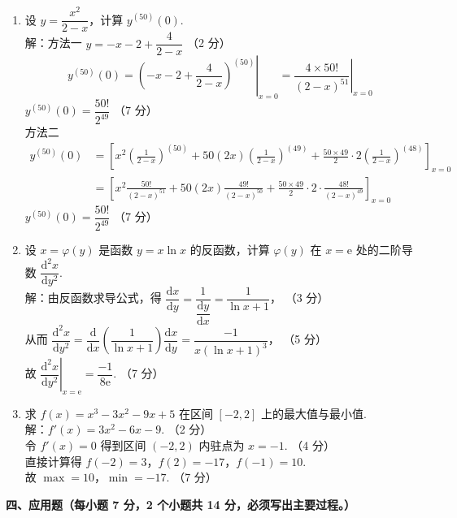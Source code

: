 \documentclass[a4paper,11pt]{ctexart}
\newcommand{\e}{\mathrm{e}}
\newcommand{\dd}{\mathrm{d}}
\newcommand{\score}[1]{\hfill（#1）}
\begin{document}
\begin{enumerate}[label=\arabic*., start=11, leftmargin=2em, itemsep=1.0em, topsep=0.5em]
  \item 设 $y = \dfrac{x^2}{2-x}$，计算 $y^{(50)}(0)$.\\[0.3em]
  解：方法一 \quad $y = -x - 2 + \dfrac{4}{2-x}$ \score{2 分}
  \[
    y^{(50)}(0) = \left.\left(-x - 2 + \frac{4}{2-x}\right)^{(50)}\right|_{x=0} = \left.\frac{4\times 50!}{(2-x)^{51}}\right|_{x=0} \tag*{（5 分）}
  \]
  $y^{(50)}(0) = \dfrac{50!}{2^{49}}$ \score{7 分}\\[0.4em]
  方法二
  \begin{align*}
    y^{(50)}(0) &= \left[ x^2\left(\frac{1}{2-x}\right)^{(50)} + 50(2x)\left(\frac{1}{2-x}\right)^{(49)} + \frac{50\times 49}{2}\cdot 2\left(\frac{1}{2-x}\right)^{(48)} \right]_{x=0} \tag*{（3 分）} \\
    &= \left[ x^2\frac{50!}{(2-x)^{51}} + 50(2x)\frac{49!}{(2-x)^{50}} + \frac{50\times 49}{2}\cdot 2\cdot\frac{48!}{(2-x)^{49}} \right]_{x=0} \tag*{（5 分）}
  \end{align*}
  $y^{(50)}(0) = \dfrac{50!}{2^{49}}$ \score{7 分}

  \item 设 $x = \varphi(y)$ 是函数 $y = x\ln x$ 的反函数，计算 $\varphi(y)$ 在 $x = \e$ 处的二阶导数 $\dfrac{\dd^2 x}{\dd y^2}$.\\[0.3em]
  解：由反函数求导公式，得 $\dfrac{\dd x}{\dd y} = \dfrac{1}{\dfrac{\dd y}{\dd x}} = \dfrac{1}{\ln x + 1}$， \score{3 分}\\[0.4em]
  从而 $\dfrac{\dd^2 x}{\dd y^2} = \dfrac{\dd}{\dd x}\left(\dfrac{1}{\ln x + 1}\right)\dfrac{\dd x}{\dd y} = \dfrac{-1}{x(\ln x + 1)^3}$， \score{5 分}\\[0.4em]
  故 $\left.\dfrac{\dd^2 x}{\dd y^2}\right|_{x=\e} = \dfrac{-1}{8\e}$. \score{7 分}

  \item 求 $f(x) = x^3 - 3x^2 - 9x + 5$ 在区间 $[-2, 2]$ 上的最大值与最小值.\\[0.3em]
  解：$f'(x) = 3x^2 - 6x - 9$. \score{2 分}\\[0.3em]
  令 $f'(x) = 0$ 得到区间 $(-2, 2)$ 内驻点为 $x = -1$. \score{4 分}\\[0.3em]
  直接计算得 $f(-2) = 3$，$f(2) = -17$，$f(-1) = 10$.\\[0.3em]
  故 $\max = 10$，$\min = -17$. \score{7 分}
\end{enumerate}

\vspace{0.8em}

\textbf{四、应用题（每小题 7 分，2 个小题共 14 分，必须写出主要过程。）}
\end{document}
